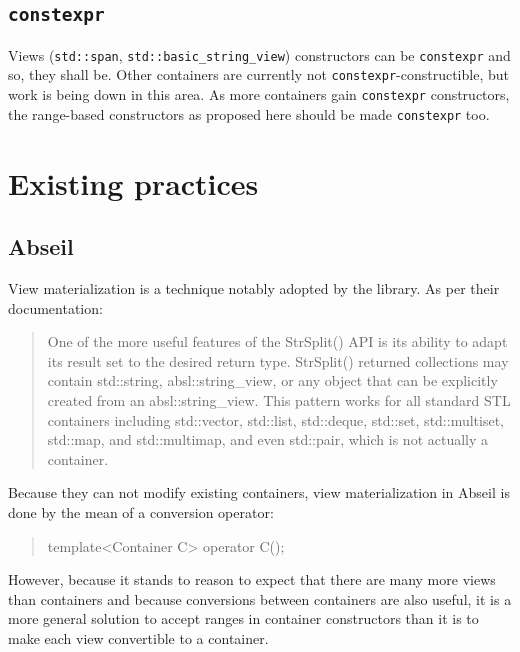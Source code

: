 \documentclass{wg21}
\newcommand{\cc}[1]{\texttt{#1}}
\begin{document}
\subsection{\cc{constexpr}}

Views (\cc{std::span}, \cc{std::basic_string_view}) constructors can be \cc{constexpr} and so, they shall be.
Other containers are currently not \cc{constexpr}-constructible, but work is being down in this area.
As more containers gain \cc{constexpr} constructors, the range-based constructors as proposed here should be made \cc{constexpr} too.

\section{Existing practices}

\subsection{Abseil}

View materialization is a technique notably adopted by the \cite{Abseil} library. As per their documentation:

\begin{quote}
    One of the more useful features of the StrSplit() API is its ability to adapt its result set to the desired return type.
    StrSplit() returned collections may contain std::string, absl::string_view, or any object that can be explicitly created from an absl::string_view.
    This pattern works for all standard STL containers including std::vector,
    std::list, std::deque, std::set, std::multiset, std::map, and std::multimap, and even std::pair, which is not actually a container.
\end{quote}

Because they can not modify existing containers, view materialization in Abseil is done by the mean of a conversion operator:

\begin{quote}
\begin{codeblock}
template<Container C>
operator C();
\end{codeblock}
\end{quote}

However, because it stands to reason to expect that there are many more views than containers and because conversions between containers are also useful,
it is a more general solution to accept ranges in container constructors than it is to make each view convertible to a container.
\end{document}
